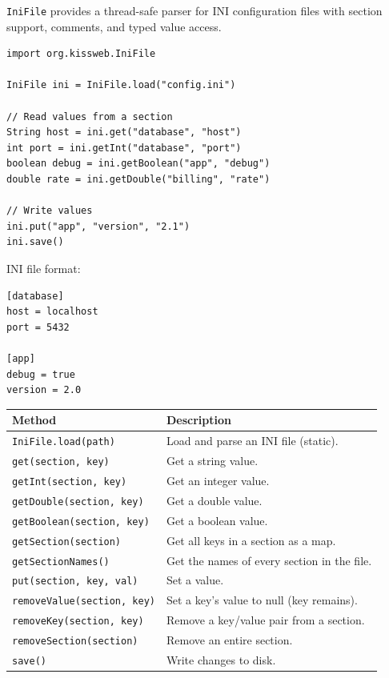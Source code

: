\texttt{IniFile} provides a thread-safe parser for INI configuration files with section support, comments, and typed value access.

\begin{lstlisting}[style=groovy]
import org.kissweb.IniFile

IniFile ini = IniFile.load("config.ini")

// Read values from a section
String host = ini.get("database", "host")
int port = ini.getInt("database", "port")
boolean debug = ini.getBoolean("app", "debug")
double rate = ini.getDouble("billing", "rate")

// Write values
ini.put("app", "version", "2.1")
ini.save()
\end{lstlisting}

\noindent
INI file format:

\begin{lstlisting}[style=ini]
[database]
host = localhost
port = 5432

[app]
debug = true
version = 2.0
\end{lstlisting}

\begin{longtable}{P{4.8cm}P{5.7cm}}
\toprule
\textbf{Method} & \textbf{Description} \\
\midrule
\endhead
\texttt{IniFile.load(path)} & Load and parse an INI file (static). \\
\texttt{get(section, key)} & Get a string value. \\
\texttt{getInt(section, key)} & Get an integer value. \\
\texttt{getDouble(section, key)} & Get a double value. \\
\texttt{getBoolean(section, key)} & Get a boolean value. \\
\texttt{getSection(section)} & Get all keys in a section as a map. \\
\texttt{getSectionNames()} & Get the names of every section in the file. \\
\texttt{put(section, key, val)} & Set a value. \\
\texttt{removeValue(section, key)} & Set a key's value to null (key remains). \\
\texttt{removeKey(section, key)} & Remove a key/value pair from a section. \\
\texttt{removeSection(section)} & Remove an entire section. \\
\texttt{save()} & Write changes to disk. \\
\bottomrule
\end{longtable}

